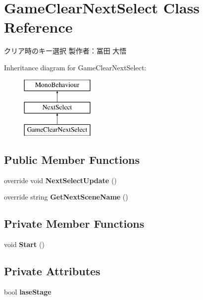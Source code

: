 \hypertarget{class_game_clear_next_select}{}\section{Game\+Clear\+Next\+Select Class Reference}
\label{class_game_clear_next_select}


クリア時のキー選択 製作者：冨田 大悟  


Inheritance diagram for Game\+Clear\+Next\+Select\+:\begin{figure}[H]
\begin{center}
\leavevmode
\includegraphics[height=3.000000cm]{class_game_clear_next_select}
\end{center}
\end{figure}
\subsection*{Public Member Functions}
\begin{DoxyCompactItemize}
\item 
\mbox{\label{class_game_clear_next_select_a2f10c436bc34e623a7a817357ccdc897}} 
override void {\bfseries Next\+Select\+Update} ()
\item 
\mbox{\label{class_game_clear_next_select_a79f0209aa9bf09c1622e78977c85a39a}} 
override string {\bfseries Get\+Next\+Scene\+Name} ()
\end{DoxyCompactItemize}
\subsection*{Private Member Functions}
\begin{DoxyCompactItemize}
\item 
\mbox{\label{class_game_clear_next_select_a9d22054e73199218a4636d4d4211f890}} 
void {\bfseries Start} ()
\end{DoxyCompactItemize}
\subsection*{Private Attributes}
\begin{DoxyCompactItemize}
\item 
\mbox{\label{class_game_clear_next_select_a113be829c81ff7d854a9f33925efea95}} 
bool {\bfseries lase\+Stage}
\end{DoxyCompactItemize}
